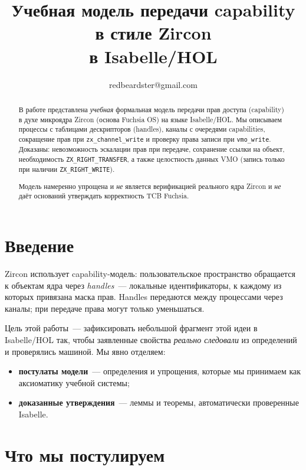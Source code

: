 \documentclass[11pt,a4paper]{article}
\begin{document}
\title{Учебная модель передачи capability в стиле Zircon\\
в Isabelle/HOL}
\author{redbeardster@gmail.com}
\maketitle

\begin{abstract}
В работе представлена \emph{учебная} формальная модель передачи прав
доступа (capability) в духе микроядра Zircon (основа Fuchsia OS) на языке
Isabelle/HOL. Мы описываем процессы с таблицами дескрипторов (handles),
каналы с очередями capabilities, сокращение прав при
\texttt{zx\_channel\_write} и проверку права записи при \texttt{vmo\_write}.
Доказаны: невозможность эскалации прав при передаче, сохранение ссылки на
объект, необходимость \texttt{ZX\_RIGHT\_TRANSFER}, а также целостность
данных VMO (запись только при наличии \texttt{ZX\_RIGHT\_WRITE}).

Модель намеренно упрощена и \emph{не} является верификацией реального ядра
Zircon и \emph{не} даёт оснований утверждать корректность TCB Fuchsia.
\end{abstract}

\section{Введение}

Zircon использует capability-модель: пользовательское пространство обращается
к объектам ядра через \emph{handles}~--- локальные идентификаторы, к каждому
из которых привязана маска прав. Handles передаются между процессами через
каналы; при передаче права могут только уменьшаться.

Цель этой работы~--- зафиксировать небольшой фрагмент этой идеи в Isabelle/HOL
так, чтобы заявленные свойства \emph{реально следовали} из определений и
проверялись машиной. Мы явно отделяем:
\begin{itemize}
  \item \textbf{постулаты модели}~--- определения и упрощения, которые мы
        принимаем как аксиоматику учебной системы;
  \item \textbf{доказанные утверждения}~--- леммы и теоремы, автоматически
        проверенные Isabelle.
\end{itemize}

\section{Что мы постулируем}
\end{document}
